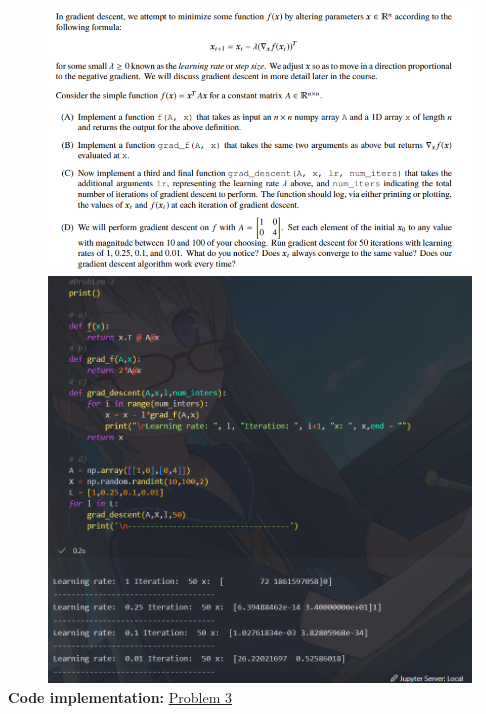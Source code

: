 \documentclass[
]{article}
\begin{document}
\includegraphics[width=6.49167in,height=2.74167in]{image3.png}
\includegraphics[width=6.49167in,height=4.24167in]{image4.png}
\textbf{Code implementation:} \href{https://colab.research.google.com/github/dtungpka/Applied-Mathematics-for-Artificial-Intelligence/blob/main/Assignment_3/Assignment%203.ipynb#scrollTo=Problem_3}{Problem 3}
\end{document}
